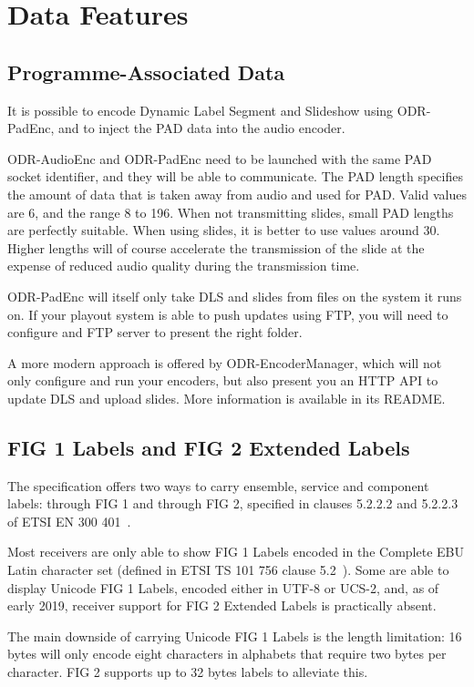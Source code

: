 \section{Data Features}
\subsection{Programme-Associated Data}
It is possible to encode Dynamic Label Segment and Slideshow using ODR-PadEnc,
and to inject the PAD data into the audio encoder.

ODR-AudioEnc and ODR-PadEnc need to be launched with the same PAD socket
identifier, and they will be able to communicate. The PAD length specifies the
amount of data that is taken away from audio and used for PAD. Valid values are
6, and the range 8 to 196. When not transmitting slides, small PAD lengths
are perfectly suitable. When using slides, it is better to use values around 30.
Higher lengths will of course accelerate the transmission of the slide at the
expense of reduced audio quality during the transmission time.

ODR-PadEnc will itself only take DLS and slides from files on the
system it runs on.
If your playout system is able to push updates using FTP, you will need to
configure and FTP server to present the right folder.

A more modern approach is offered by ODR-EncoderManager, which will not only
configure and run your encoders, but also present you an HTTP API to update DLS
and upload slides. More information is available in its README.

\subsection{FIG 1 Labels and FIG 2 Extended Labels}
The specification offers two ways to carry ensemble, service and component
labels: through FIG 1 and through FIG 2, specified in clauses 5.2.2.2 and 5.2.2.3
of ETSI EN 300 401~\cite{etsidab}.

Most receivers are only able to show FIG 1 Labels encoded in the Complete EBU
Latin character set (defined in ETSI TS 101 756 clause
5.2~\cite{etsidabtables}). Some are able to display Unicode FIG 1 Labels,
encoded either in UTF-8 or UCS-2, and, as of early 2019, receiver support for
FIG 2 Extended Labels is practically absent.

The main downside of carrying Unicode FIG 1 Labels is the length limitation: 16
bytes will only encode eight characters in alphabets that require two bytes per
character. FIG 2 supports up to 32 bytes labels to alleviate this.

